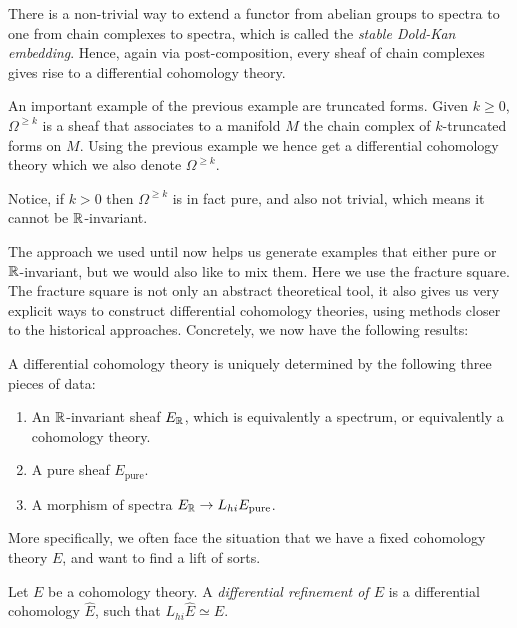 \documentclass[10pt]{amsart}
\begin{document}
\begin{example}
  There is a non-trivial way to extend a functor from abelian groups to spectra to one from chain complexes to spectra, which is called the \emph{stable Dold-Kan embedding}. Hence, again via post-composition, every sheaf of chain complexes gives rise to a differential cohomology theory.
\end{example}

\begin{example}
 An important example of the previous example are truncated forms. Given $k \geq 0$, $\Omega^{\geq k}$ is a sheaf that associates to a manifold $M$ the chain complex of $k$-truncated forms on $M$. Using the previous example we hence get a differential cohomology theory which we also denote $\Omega^{\geq k }$.

 Notice, if $k > 0$ then $\Omega^{\geq k}$ is in fact pure, and also not trivial, which means it cannot be $\mathbb{R}$-invariant.
\end{example}

The approach we used until now helps us generate examples that either pure or $\mathbb{R}$-invariant, but we would also like to mix them. Here we use the fracture square. The fracture square is not only an abstract theoretical tool, it also gives us very explicit ways to construct differential cohomology theories, using methods closer to the historical approaches. Concretely, we now have the following results:

\begin{corollary}
  A differential cohomology theory is uniquely determined by the following three pieces of data:
  \begin{enumerate}
    \item An $\mathbb{R}$-invariant sheaf $E_{\mathbb{R}}$, which is equivalently a spectrum, or equivalently a cohomology theory.
    \item A pure sheaf $E_{\mathrm{pure}}$. 
    \item A morphism of spectra $E_{\mathbb{R}} \to L_{hi}E_{\mathrm{pure}}$.
  \end{enumerate}
\end{corollary}

More specifically, we often face the situation that we have a fixed cohomology theory $E$, and want to find a lift of sorts.

\begin{definition}
  Let $E$ be a cohomology theory. A \emph{differential refinement of $E$} is a differential cohomology $\hat{E}$, such that $L_{hi}\hat{E} \simeq E$.
\end{definition}
\end{document}
